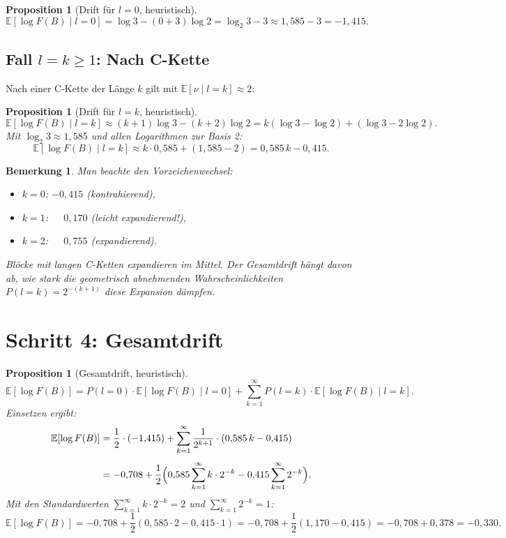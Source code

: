 \documentclass[12pt,a4paper]{article}
\newtheorem{proposition}[definition]{Proposition}
\newtheorem{bemerkung}[definition]{Bemerkung}
\newcommand{\E}{\mathbb{E}}
\newcommand{\logF}{\log F(B)}
\begin{document}
\begin{proposition}[Drift für $l=0$, heuristisch]
\label{prop:drift_l0}
\[
  \E[\logF \mid l=0]
  = \log 3 - (0+3)\log 2
  = \log_2 3 - 3
  \approx 1{,}585 - 3 = -1{,}415.
\]
\end{proposition}

\subsection{Fall \texorpdfstring{$l=k \geq 1$}{l=k>=1}: Nach C-Kette}

Nach einer C-Kette der Länge $k$ gilt mit $\E[\nu \mid l{=}k] \approx 2$:

\begin{proposition}[Drift für $l=k$, heuristisch]
\label{prop:drift_lk}
\[
  \E[\logF \mid l=k]
  \approx (k+1)\log 3 - (k+2)\log 2
  = k(\log 3 - \log 2) + (\log 3 - 2\log 2).
\]
Mit $\log_2 3 \approx 1{,}585$ und allen Logarithmen zur Basis 2:
\[
  \E[\logF \mid l=k]
  \approx k \cdot 0{,}585 + (1{,}585 - 2)
  = 0{,}585\,k - 0{,}415.
\]
\end{proposition}

\begin{bemerkung}
Man beachte den Vorzeichenwechsel:
\begin{itemize}[noitemsep]
  \item $k=0$: $-0{,}415$ (kontrahierend),
  \item $k=1$: $\phantom{-}0{,}170$ (leicht expandierend!),
  \item $k=2$: $\phantom{-}0{,}755$ (expandierend).
\end{itemize}
Blöcke mit langen C-Ketten expandieren im Mittel.
Der Gesamtdrift hängt davon ab, wie stark die geometrisch abnehmenden
Wahrscheinlichkeiten $P(l=k) = 2^{-(k+1)}$ diese Expansion dämpfen.
\end{bemerkung}

\section{Schritt 4: Gesamtdrift}
\label{sec:gesamtdrift}

\begin{proposition}[Gesamtdrift, heuristisch]
\label{prop:gesamtdrift}
\[
  \E[\logF]
  = P(l=0)\cdot\E[\logF \mid l=0]
    + \sum_{k=1}^{\infty} P(l=k)\cdot\E[\logF \mid l=k].
\]
Einsetzen ergibt:
\begin{align*}
  \E[\logF]
  &= \frac{1}{2}\cdot(-1{,}415)
     + \sum_{k=1}^{\infty} \frac{1}{2^{k+1}}\cdot(0{,}585\,k - 0{,}415)\\[4pt]
  &= -0{,}708
     + \frac{1}{2}\Bigl(
         0{,}585\sum_{k=1}^{\infty} k\cdot 2^{-k}
         - 0{,}415\sum_{k=1}^{\infty} 2^{-k}
       \Bigr).
\end{align*}
Mit den Standardwerten $\sum_{k=1}^{\infty} k \cdot 2^{-k} = 2$ und
$\sum_{k=1}^{\infty} 2^{-k} = 1$:
\[
  \E[\logF]
  = -0{,}708 + \frac{1}{2}(0{,}585\cdot 2 - 0{,}415\cdot 1)
  = -0{,}708 + \frac{1}{2}(1{,}170 - 0{,}415)
  = -0{,}708 + 0{,}378
  = -0{,}330.
\]
\end{proposition}
\end{document}
